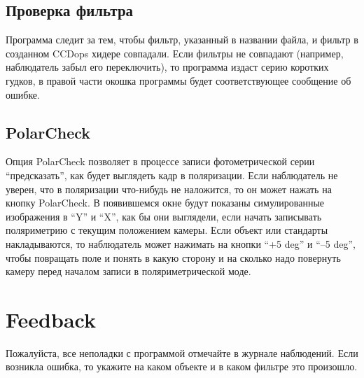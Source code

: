 \documentclass[a4paper,12pt,leqno,notitlepage]{article}
\begin{document}
\subsection{Проверка фильтра}
Программа следит за тем, чтобы фильтр, указанный в названии файла, и фильтр в созданном CCDops хидере
совпадали. Если фильтры не совпадают (например, наблюдатель забыл его переключить), то программа
издаст серию коротких гудков, в правой части окошка программы будет соответствующее сообщение об ошибке.

\subsection{PolarCheck}
Опция PolarCheck позволяет в процессе записи фотометрической серии ``предсказать'', как будет выглядеть
кадр в поляризации. Если наблюдатель не уверен, что в поляризации что-нибудь не наложится, то он может
нажать на кнопку PolarCheck. В появившемся окне будут показаны симулированные изображения в ``Y'' и ``X'',
как бы они выглядели, если начать записывать поляриметрию с текущим положением камеры. Если объект
или стандарты накладываются, то наблюдатель может нажимать на кнопки ``+5 deg'' и ``--5 deg'', чтобы
повращать поле и понять в какую сторону и на сколько надо повернуть камеру перед началом записи
в поляриметрической моде.

\section{Feedback}
Пожалуйста, все неполадки с программой отмечайте в журнале наблюдений. Если возникла ошибка, то
укажите на каком объекте и в каком фильтре это произошло.
\end{document}
